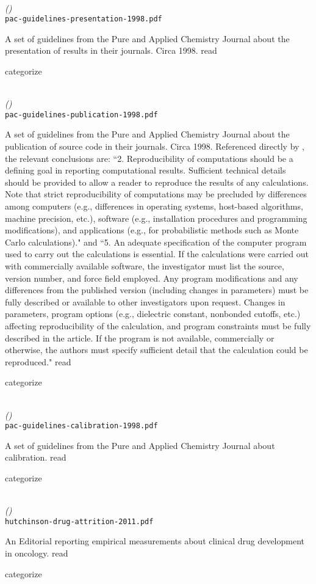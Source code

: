 \documentclass[american]{article}
\newcommand{\Read}{
	\gls{read}
}
\newcommand{\categorize}{
	\gls{categorize}
}
\newenvironment{refdef}[2] {
	\noindent \textbf{\citetitle{#1}} \cite{#1}\\ \citejournalorbooktitle{#1} \textit{(\citeyear{#1})}\\ \texttt{#2} \vspace{0.2in} \par 
} {
\vspace{0.2in}
}
\begin{document}
\begin{refdef}{pac-guidelines-presentation-1998}{pac-guidelines-presentation-1998.pdf}
A set of guidelines from the Pure and Applied Chemistry Journal about the presentation of results in their journals. Circa 1998. \Read \categorize
\end{refdef}

\begin{refdef}{pac-guidelines-publication-1998}{pac-guidelines-publication-1998.pdf}
A set of guidelines from the Pure and Applied Chemistry Journal about the publication of source code in their journals. Circa 1998. Referenced directly by \cite{banned-by-gaussian}, the relevant conclusions are: ``2. Reproducibility of computations should be a defining goal in reporting computational results. Sufficient technical details should be provided to allow a reader to reproduce the results of any calculations. Note that strict reproducibility of computations may be precluded by differences among computers (e.g., differences in operating systems, host-based algorithms, machine precision, etc.), software (e.g., installation procedures and programming modifications), and applications (e.g., for probabilistic methods such as Monte Carlo calculations)." and ``5. An adequate specification of the computer program used to carry out the calculations is essential. If the calculations were carried out with commercially available software, the investigator must list the source, version number, and force field employed. Any program modifications and any differences from the published version (including changes in parameters) must be fully described or available to other investigators upon request. Changes in parameters, program options (e.g., dielectric constant, nonbonded cutoffs, etc.) affecting reproducibility of the calculation, and program constraints must be fully described in the article. If the program is not available, commercially or otherwise, the authors must specify sufficient detail that the calculation could be reproduced." \Read \categorize
\end{refdef}

\begin{refdef}{pac-guidelines-calibration-1998}{pac-guidelines-calibration-1998.pdf}
A set of guidelines from the Pure and Applied Chemistry Journal about calibration. \Read \categorize
\end{refdef}

\begin{refdef}{hutchinson-drug-attrition-2011}{hutchinson-drug-attrition-2011.pdf}
An Editorial reporting empirical measurements about clinical drug development in oncology. \Read \categorize
\end{refdef}
\end{document}
